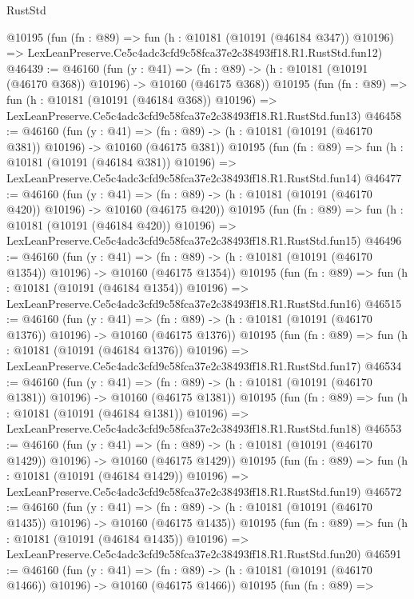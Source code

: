 \begin{lexlean}{RustStd}
\begin{coremodule}
    @10195
    (fun (fn : @89) =>
    fun (h : @10181 (@10191 (@46184 @347)) @10196) =>
    LexLeanPreserve.Ce5c4adc3cfd9c58fca37e2c38493ff18.R1.RustStd.fun12)
@46439 := @46160
    (fun (y : @41) =>
    (fn : @89) -> (h : @10181 (@10191 (@46170 @368)) @10196) -> @10160 (@46175 @368))
    @10195
    (fun (fn : @89) =>
    fun (h : @10181 (@10191 (@46184 @368)) @10196) =>
    LexLeanPreserve.Ce5c4adc3cfd9c58fca37e2c38493ff18.R1.RustStd.fun13)
@46458 := @46160
    (fun (y : @41) =>
    (fn : @89) -> (h : @10181 (@10191 (@46170 @381)) @10196) -> @10160 (@46175 @381))
    @10195
    (fun (fn : @89) =>
    fun (h : @10181 (@10191 (@46184 @381)) @10196) =>
    LexLeanPreserve.Ce5c4adc3cfd9c58fca37e2c38493ff18.R1.RustStd.fun14)
@46477 := @46160
    (fun (y : @41) =>
    (fn : @89) -> (h : @10181 (@10191 (@46170 @420)) @10196) -> @10160 (@46175 @420))
    @10195
    (fun (fn : @89) =>
    fun (h : @10181 (@10191 (@46184 @420)) @10196) =>
    LexLeanPreserve.Ce5c4adc3cfd9c58fca37e2c38493ff18.R1.RustStd.fun15)
@46496 := @46160
    (fun (y : @41) =>
    (fn : @89) -> (h : @10181 (@10191 (@46170 @1354)) @10196) -> @10160 (@46175 @1354))
    @10195
    (fun (fn : @89) =>
    fun (h : @10181 (@10191 (@46184 @1354)) @10196) =>
    LexLeanPreserve.Ce5c4adc3cfd9c58fca37e2c38493ff18.R1.RustStd.fun16)
@46515 := @46160
    (fun (y : @41) =>
    (fn : @89) -> (h : @10181 (@10191 (@46170 @1376)) @10196) -> @10160 (@46175 @1376))
    @10195
    (fun (fn : @89) =>
    fun (h : @10181 (@10191 (@46184 @1376)) @10196) =>
    LexLeanPreserve.Ce5c4adc3cfd9c58fca37e2c38493ff18.R1.RustStd.fun17)
@46534 := @46160
    (fun (y : @41) =>
    (fn : @89) -> (h : @10181 (@10191 (@46170 @1381)) @10196) -> @10160 (@46175 @1381))
    @10195
    (fun (fn : @89) =>
    fun (h : @10181 (@10191 (@46184 @1381)) @10196) =>
    LexLeanPreserve.Ce5c4adc3cfd9c58fca37e2c38493ff18.R1.RustStd.fun18)
@46553 := @46160
    (fun (y : @41) =>
    (fn : @89) -> (h : @10181 (@10191 (@46170 @1429)) @10196) -> @10160 (@46175 @1429))
    @10195
    (fun (fn : @89) =>
    fun (h : @10181 (@10191 (@46184 @1429)) @10196) =>
    LexLeanPreserve.Ce5c4adc3cfd9c58fca37e2c38493ff18.R1.RustStd.fun19)
@46572 := @46160
    (fun (y : @41) =>
    (fn : @89) -> (h : @10181 (@10191 (@46170 @1435)) @10196) -> @10160 (@46175 @1435))
    @10195
    (fun (fn : @89) =>
    fun (h : @10181 (@10191 (@46184 @1435)) @10196) =>
    LexLeanPreserve.Ce5c4adc3cfd9c58fca37e2c38493ff18.R1.RustStd.fun20)
@46591 := @46160
    (fun (y : @41) =>
    (fn : @89) -> (h : @10181 (@10191 (@46170 @1466)) @10196) -> @10160 (@46175 @1466))
    @10195
    (fun (fn : @89) =>

\end{coremodule}
\end{lexlean}

